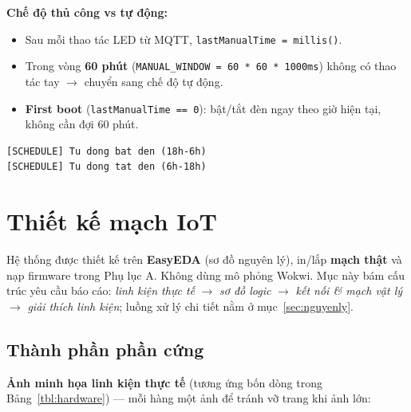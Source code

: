 \documentclass[13pt,a4paper]{article}
\newcommand{\code}[1]{\texttt{#1}}
\begin{document}
\textbf{Chế độ thủ công vs tự động:}

\begin{itemize}
    \item Sau mỗi thao tác LED từ MQTT, \code{lastManualTime = millis()}.
    \item Trong vòng \textbf{60 phút} (\code{MANUAL\_WINDOW = 60 * 60 * 1000ms}) không có thao tác tay $\rightarrow$ chuyển sang chế độ tự động.
    \item \textbf{First boot} (\code{lastManualTime == 0}): bật/tắt đèn ngay theo giờ hiện tại, không cần đợi 60 phút.
\end{itemize}

\begin{lstlisting}[style=flowcode, caption={Serial log khi tự động}]
[SCHEDULE] Tu dong bat den (18h-6h)
[SCHEDULE] Tu dong tat den (6h-18h)
\end{lstlisting}

\section{Thiết kế mạch IoT}
\label{sec:thietke}

Hệ thống được thiết kế trên \textbf{EasyEDA} (sơ đồ nguyên lý), in/lắp \textbf{mạch thật} và nạp firmware trong Phụ lục A. Không dùng mô phỏng Wokwi. Mục này bám cấu trúc yêu cầu báo cáo: \textit{linh kiện thực tế} $\rightarrow$ \textit{sơ đồ logic} $\rightarrow$ \textit{kết nối \& mạch vật lý} $\rightarrow$ \textit{giải thích linh kiện}; luồng xử lý chi tiết nằm ở mục~\ref{sec:nguyenly}.

\subsection{Thành phần phần cứng}
\label{sec:phanmem}

\textbf{Ảnh minh họa linh kiện thực tế} (tương ứng bốn dòng trong Bảng~\ref{tbl:hardware}) --- mỗi hàng một ảnh để tránh vỡ trang khi ảnh lớn:
\end{document}
